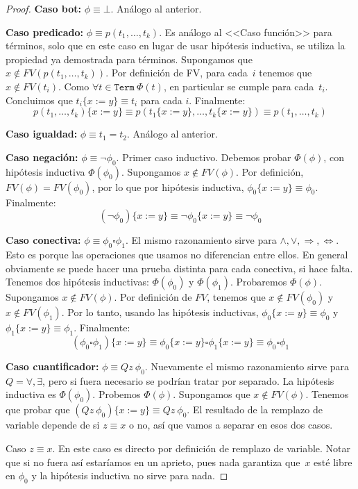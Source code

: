 \documentclass[a4paper, 12pt]{report}
\newcommand{\Ra}{\Rightarrow}
\newcommand{\Lra}{\Leftrightarrow}
\theoremstyle{definition}
\begin{document}
\begin{proof}
	\textbf{Caso bot:} $\phi\equiv\bot$. Análogo al anterior.
	
	\textbf{Caso predicado:} $\phi\equiv p(t_1,\dots,t_k)$. Es análogo al <<Caso función>> para términos, solo que en este caso en lugar de usar hipótesis inductiva, se utiliza la propiedad ya demostrada para términos. Supongamos que $x\not\in FV(p(t_1,\dots,t_k))$. Por definición de FV, para cada~$i$ tenemos que $x\not\in FV(t_i)$. Como $\forall t\in\mathtt{Term}~\Phi(t)$, en particular se cumple para cada~$t_i$. Concluimos que $t_i\{x:=y\}\equiv t_i$ para cada $i$. Finalmente: $$p(t_1,\dots,t_k)\{x:=y\}\equiv p(t_1\{x:=y\},\dots,t_k\{x:=y\})\equiv p(t_1,\dots,t_k)$$
	
	\textbf{Caso igualdad:} $\phi\equiv t_1=t_2$. Análogo al anterior.
	
	\textbf{Caso negación:} $\phi\equiv\lnot\phi_0$. Primer caso inductivo. Debemos probar $\Phi(\phi)$, con hipótesis inductiva $\Phi(\phi_0)$. Supongamos $x\not\in FV(\phi)$. Por definición, $FV(\phi)=FV(\phi_0)$, por lo que por hipótesis inductiva, $\phi_0\{x:=y\}\equiv\phi_0$. Finalmente:
	$$ (\lnot\phi_0)\{x:=y\} \equiv \lnot \phi_0\{x:=y\}\equiv \lnot\phi_0
	$$
	
	\textbf{Caso conectiva:} $\phi\equiv \phi_0\square\phi_1$. El mismo razonamiento sirve para $\wedge,\vee,\Ra,\Lra$. Esto es porque las operaciones que usamos no diferencian entre ellos. En general obviamente se puede hacer una prueba distinta para cada conectiva, si hace falta. Tenemos dos hipótesis inductivas: $\Phi(\phi_0)$ y $\Phi(\phi_1)$. Probaremos $\Phi(\phi)$. Supongamos $x\not\in FV(\phi)$. Por definición de $FV$, tenemos que $x\not\in FV(\phi_0)$ y $x\not\in FV(\phi_1)$. Por lo tanto, usando las hipótesis inductivas, $\phi_0\{x:=y\}\equiv \phi_0$ y $\phi_1\{x:=y\}\equiv \phi_1$. Finalmente:
	$$ (\phi_0\square\phi_1)\{x:=y\}\equiv \phi_0\{x:=y\}\square\phi_1\{x:=y\}\equiv \phi_0\square\phi_1
	$$
	
	\textbf{Caso cuantificador:} $\phi\equiv Qz~\phi_0$. Nuevamente el mismo razonamiento sirve para $Q=\forall,\exists$, pero si fuera necesario se podrían tratar por separado. La hipótesis inductiva es $\Phi(\phi_0)$. Probemos $\Phi(\phi)$. Supongamos que $x\not\in FV(\phi)$. Tenemos que probar que $(Qz~\phi_0)\{x:=y\}\equiv Qz~\phi_0$. El resultado de la remplazo de variable depende de si $z\equiv x$ o no, así que vamos a separar en esos dos casos.
	
	Caso $z\equiv x$. En este caso es directo por definición de remplazo de variable. Notar que si no fuera así estaríamos en un aprieto, pues nada garantiza que~$x$ esté libre en $\phi_0$ y la hipótesis inductiva no sirve para nada.
	

\end{proof}
\end{document}
